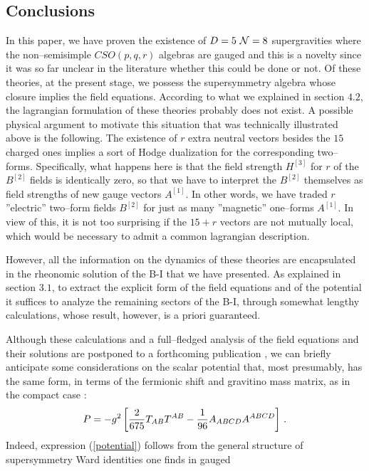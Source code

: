 \documentclass[a4paper,12pt]{article}
\begin{document}
\subsection{Conclusions}
\par
In this paper, we have proven the existence of $D=5~{\cal N}=8$
supergravities where the non--semisimple $CSO(p,q,r)$ algebras are
gauged and this is a novelty since it was so far unclear in the
literature whether this could be done or not. Of these theories,
at the present stage, we possess the supersymmetry algebra whose
closure implies the field equations. According to what we
explained in section $4.2$, the lagrangian formulation of these
theories probably does not exist. A possible physical argument to
motivate this situation that was technically illustrated above is
the following. The existence of $r$ extra neutral vectors besides
the $15$ charged ones implies a sort of Hodge dualization for the
corresponding two--forms. Specifically, what happens here is that
the field strength $H^{[3]}$ for $r$ of the $B^{[2]}$ fields is
identically zero, so that we have to interpret the $B^{[2]}$
themselves as field strengths of new gauge vectors $A^{[1]}$. In
other words, we have traded $r$ ''electric'' two--form fields
$B^{[2]}$ for just as many ''magnetic''  one--forms $A^{[1]}$. In
view of this, it is not too surprising if the $15+r$ vectors are
not mutually local, which would be necessary to admit a common
lagrangian description.
\par
However, all the information on the dynamics of these theories are
encapsulated in the rheonomic solution of the B-I that we have
presented. As explained in section $3.1$, to extract the explicit
form of the field equations and of the potential it suffices to
analyze the remaining sectors of the B-I, through somewhat lengthy
calculations, whose result, however, is a priori guaranteed.
\par
Although these calculations and a full--fledged analysis of the
field equations and their solutions are postponed to a forthcoming
publication \cite{next}, we can briefly anticipate some
considerations on the scalar potential that, most presumably, has
the same form, in terms of the fermionic shift and gravitino mass
matrix, as in the compact case \cite{gunwar}:
\begin{equation}
P=-g^2\left[{2\over 675}T_{AB}T^{AB}-{1\over
96}A_{ABCD}A^{ABCD}\right]\,. \label{potential}
\end{equation}
Indeed, expression (\ref{potential}) follows from the general
structure of supersymmetry Ward identities one finds in gauged
\end{document}
